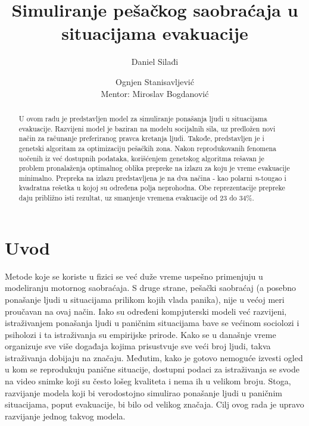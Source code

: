 \documentclass[12pt]{article}
\begin{document}
\title{\textbf{Simuliranje pešačkog saobraćaja u situacijama evakuacije}}

\author{
Daniel Silađi\\
\and
Ognjen Stanisavljević \\
Mentor: Miroslav Bogdanović
}

\date{} %
\maketitle %


\begin{abstract}
U ovom radu je predstavljen model za simuliranje ponašanja ljudi u situacijama evakuacije. Razvijeni model je baziran na modelu socijalnih sila, uz predložen novi način za računanje preferiranog pravca kretanja ljudi. Takođe, predstavljen je i genetski algoritam za optimizaciju pešačkih zona. Nakon reprodukovanih fenomena uočenih iz već dostupnih podataka, korišćenjem genetskog algoritma rešavan je problem pronalaženja optimalnog oblika prepreke na izlazu za koju je vreme evakuacije minimalno. Prepreka na izlazu predstavljena je na dva načina - kao polarni \emph{n}-tougao i kvadratna rešetka u kojoj su određena polja neprohodna. Obe reprezentacije prepreke daju približno isti rezultat, uz smanjenje vremena evakuacije od 23 do 34\%. 
\end{abstract}


\section{Uvod}

Metode koje se koriste u fizici se već duže vreme uspešno primenjuju u  modeliranju motornog saobraćaja. S druge strane, pešački saobraćaj (a posebno ponašanje ljudi u situacijama prilikom kojih vlada panika), nije u većoj meri proučavan na ovaj način. Iako su određeni kompjuterski modeli već razvijeni, istraživanjem ponašanja ljudi u paničnim situacijama bave  se većinom sociolozi i psiholozi i ta istraživanja su empirijske prirode. Kako se u današnje vreme organizuje sve više događaja kojima prisustvuje sve veći broj ljudi, takva istraživanja dobijaju na značaju. Međutim, kako je gotovo nemoguće izvesti ogled u kom se reprodukuju panične situacije, dostupni podaci za istraživanja se svode na video snimke koji su često lošeg kvaliteta i nema ih u velikom broju. Stoga, razvijanje modela koji bi verodostojno simulirao ponašanje ljudi u paničnim situacijama, poput evakuacije, bi bilo od velikog značaja. Cilj ovog rada je upravo razvijanje jednog takvog modela.
\end{document}
